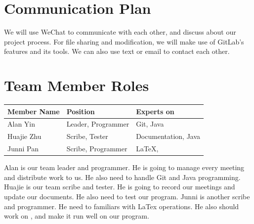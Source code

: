 \documentclass[12pt]{article}
\begin{document}
\newpage
\section{Communication Plan}
We will use WeChat to communicate with each other, and discuss about our project process. For file sharing and modification, we will make use of GitLab's features and its tools. We can also use text or email to contact each other.

\section{Team Member Roles}
\begin{tabular}{ | m{8em} | m{4.5cm}| m{4.5cm} | } 
\hline
Member Name & Position & Experts on \\
\hline
Alan Yin & Leader, Programmer & Git, Java \\ 
\hline
Huajie Zhu & Scribe, Tester & Documentation, Java  \\ 
\hline
Junni Pan & Scribe, Programmer & LaTeX, \color{red}{Slick2D}\\ 
\hline
\end{tabular}

\noindent
\newline
Alan is our team leader and programmer. He is going to manage every meeting and distribute work to us. He also need to handle Git and Java programming. Huajie is our team scribe and tester. He is going to record our meetings and update our documents. He also need to test our program. Junni is another scribe and programmer. He need to familiars with LaTex operations. He also should work on \color{red}{Slick2D}, and make it run well on our program\color{black}.
\end{document}
